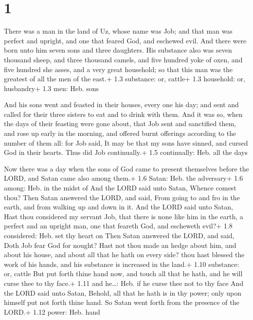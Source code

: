 \hypertarget{section}{%
\section{1}\label{section}}

 There was a man in the land of Uz, whose name was Job; and
that man was perfect and upright, and one that feared God, and eschewed
evil.  And there were born unto him seven sons and three
daughters.  His substance also was seven thousand sheep, and
three thousand camels, and five hundred yoke of oxen, and five hundred
she asses, and a very great household; so that this man was the greatest
of all the men of the east.+ 1.3 substance: or, cattle+ 1.3 household:
or, husbandry+ 1.3 men: Heb. sons

 And his sons went and feasted in their houses, every one
his day; and sent and called for their three sisters to eat and to drink
with them.  And it was so, when the days of their feasting
were gone about, that Job sent and sanctified them, and rose up early in
the morning, and offered burnt offerings according to the number of them
all: for Job said, It may be that my sons have sinned, and cursed God in
their hearts. Thus did Job continually.+ 1.5 continually: Heb. all the
days

 Now there was a day when the sons of God came to present
themselves before the LORD, and Satan came also among them.+ 1.6 Satan:
Heb. the adversary+ 1.6 among: Heb. in the midst of  And the
LORD said unto Satan, Whence comest thou? Then Satan answered the LORD,
and said, From going to and fro in the earth, and from walking up and
down in it.  And the LORD said unto Satan, Hast thou
considered my servant Job, that there is none like him in the earth, a
perfect and an upright man, one that feareth God, and escheweth evil?+
1.8 considered: Heb. set thy heart on  Then Satan answered
the LORD, and said, Doth Job fear God for nought?  Hast not
thou made an hedge about him, and about his house, and about all that he
hath on every side? thou hast blessed the work of his hands, and his
substance is increased in the land.+ 1.10 substance: or, cattle
 But put forth thine hand now, and touch all that he hath,
and he will curse thee to thy face.+ 1.11 and he\ldots: Heb. if he curse
thee not to thy face  And the LORD said unto Satan, Behold,
all that he hath is in thy power; only upon himself put not forth thine
hand. So Satan went forth from the presence of the LORD.+ 1.12 power:
Heb. hand

